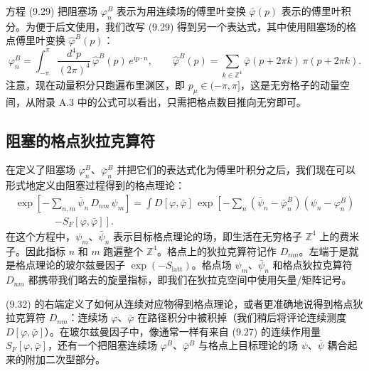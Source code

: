 方程 (9.29) 把阻塞场 $\varphi^B_n$ 表示为用连续场的傅里叶变换 $\bar\varphi(p)$ 表示的傅里叶积分。为便于后文使用，我们改写 (9.29) 得到另一个表达式，其中使用阻塞场的格点傅里叶变换 $\hat\varphi^B(p)$：
\begin{equation}
  \varphi^B_n = \int_{-\pi}^{\pi}\frac{d^4p}{(2\pi)^4}\,\hat\varphi^B(p)\,e^{ip\cdot n} ,
  \qquad
  \hat\varphi^B(p) = \sum_{k\in\mathbb{Z}^4}\bar\varphi(p+2\pi k)\,\pi(p+2\pi k) .
\end{equation}
注意，现在动量积分只跑遍布里渊区，即 $p_\mu \in (-\pi, \pi]$，这是无穷格子的动量空间，从附录 A.3 中的公式可以看出，只需把格点数目推向无穷即可。

\subsection{阻塞的格点狄拉克算符}
\label{sec:9.2.2}

在定义了阻塞场 $\varphi^B_n$、$\bar\varphi^B_n$ 并把它们的表达式化为傅里叶积分之后，我们现在可以形式地定义由阻塞过程得到的格点理论：
\begin{multline}
  \exp\!\left[-\sum_{n,m}\bar\psi_n\,D_{nm}\,\psi_m\right]
  = \int D[\varphi,\bar\varphi]\,
    \exp\!\left[-\sum_n\left(\bar\psi_n-\bar\varphi^B_n\right)
      \left(\psi_n-\varphi^B_n\right)\right. \\
  \qquad\qquad \left.- S_F[\varphi,\bar\varphi]\right] .
\end{multline}
在这个方程中，$\psi_m$、$\bar\psi_n$ 表示目标格点理论的场，即生活在无穷格子 $\mathbb{Z}^4$ 上的费米子。因此指标 $n$ 和 $m$ 跑遍整个 $\mathbb{Z}^4$。格点上的狄拉克算符记作 $D_{nm}$。左端于是就是格点理论的玻尔兹曼因子 $\exp(-S_{\mathrm{latt}})$。格点场 $\psi_m$、$\bar\psi_n$ 和格点狄拉克算符 $D_{nm}$ 都携带我们略去的旋量指标，即我们在狄拉克空间中使用矢量/矩阵记号。

(9.32) 的右端定义了如何从连续对应物得到格点理论，或者更准确地说得到格点狄拉克算符 $D_{nm}$：连续场 $\varphi$、$\bar\varphi$ 在路径积分中被积掉（我们稍后将评论连续测度 $D[\varphi,\bar\varphi]$）。在玻尔兹曼因子中，像通常一样有来自 (9.27) 的连续作用量 $S_F[\varphi,\bar\varphi]$，还有一个把阻塞连续场 $\varphi^B$、$\bar\varphi^B$ 与格点上目标理论的场 $\psi$、$\bar\psi$ 耦合起来的附加二次型部分。

